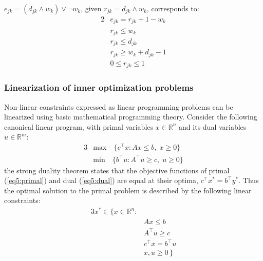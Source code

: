 \noindent $e_{jk} = (d_{jk} \land w_k) \lor \lnot w_k$, given $r_{jk} = d_{jk} \land w_k$, corresponds to:
\begin{alignat}{2}
& e_{jk} = r_{jk} + 1 - w_k  \\
& r_{jk} \le w_k  \\
& r_{jk} \le d_{jk}\\
& r_{jk} \ge w_k + d_{jk} - 1 \\
& 0 \le r_{jk} \le 1
\end{alignat}

\subsubsection{Linearization of inner optimization problems} \label{sec:linearization}

Non-linear constraints expressed as linear programming problems can be linearized using basic mathematical programming theory. Consider the following canonical linear program, with primal variables $x\in\mathbb{R}^n$ and its dual variables $u\in \mathbb{R}^m$:
\begin{alignat}{3}
& \text{max} \quad \{c^\top x: Ax \le b ,\; x \ge 0 \} \label{eq5:primal} \\
& \text{min} \quad \{b^\top u: A^\top u \ge c ,\; u \ge 0 \} \label{eq5:dual}
\end{alignat}
\noindent the strong duality theorem states that the objective functions of primal (\ref{eq5:primal}) and dual (\ref{eq5:dual}) are equal at their optima, $c^\top x^* = b^\top y^*$. Thus the optimal solution to the primal problem is described by the following linear constraints:
\begin{alignat}{3}
x^* \in \{x \in \mathbb{R}^n: \\
& Ax \le b \\
& A^\top u \ge c \\
& c^\top x = b^\top u\\
& x,u \ge 0 \,\}
\end{alignat}

